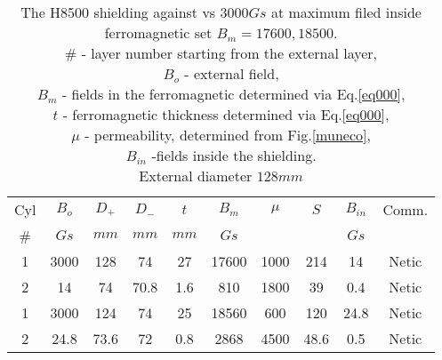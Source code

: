 \documentclass[12pt]{article}
\begin{document}
\begin{table}[htbp]
\begin{center}
\begin{tabular}{|c|c|c|c|c|c|c|c|c|c|} \hline
Cyl&$B_{o}$& $D_+$ & $D_-$ & $t$  & $B_m$  & $\mu$   & $S$    &$B_{in}$         & Comm. \\ 
\#&$Gs$    & $mm$  & $mm$  & $mm$ & $Gs$   &         &        &$Gs$             &       \\ \hline  
1 &3000    &  128  &  74   & 27   &  17600 &  1000   &  214   &  14             & Netic \\ 
2 &14      &  74   &  70.8 & 1.6  &  810   &  1800   &  39    & 0.4             & Netic  \\ \hline \hline 
1&3000     &   124 &  74   & 25   & 18560  & 600     & 120    & 24.8            & Netic \\ 
2&24.8     & 73.6  &  72   & 0.8  & 2868   & 4500    & 48.6   & 0.5             & Netic \\ \hline
\end{tabular}                                                      
\end{center}
\caption{The H8500 shielding   against vs  $3000Gs$  at maximum   
filed inside  ferromagnetic  set $B_m=17600, 18500$. \\
$\#$ - layer number starting from the external layer, \\
$B_o$ - external field, \\
$B_m$ - fields in the ferromagnetic determined via   Eq.\ref{eq000}, \\
$t$ - ferromagnetic thickness  determined via   Eq.\ref{eq000}, \\
$\mu$ - permeability, determined from Fig.\ref{muneco},\\
$B_{in}$ -fields inside the shielding.\\
External diameter $128mm$    \label{H8500at17600} }
\end{table}
\clearpage
\end{document}
